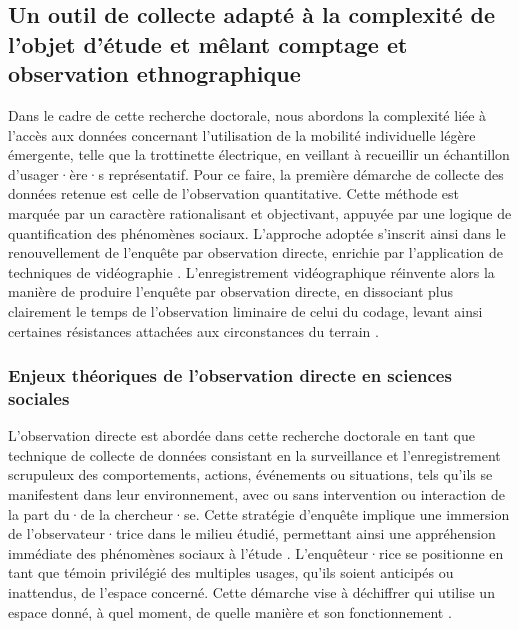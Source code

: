 \begin{refsegment}
\subsection{Un outil de collecte adapté à la complexité de l’objet d’étude et mêlant comptage et observation ethnographique
    \label{chap3:observation-quantitative-outil-adapte}
    }
    
Dans le cadre de cette recherche doctorale, nous abordons la complexité liée à l'accès aux données concernant l'utilisation de la mobilité individuelle légère émergente, telle que la trottinette électrique, en veillant à recueillir un échantillon d'usager·ère·s représentatif. Pour ce faire, la première démarche de collecte des données retenue est celle de l'observation quantitative. Cette méthode est marquée par un caractère rationalisant et objectivant, appuyée par une logique de quantification des phénomènes sociaux. L'approche adoptée s'inscrit ainsi dans le renouvellement de l'enquête par observation directe, enrichie par l'application de techniques de vidéographie \textcolor{blue}{\autocite[43]{filion_compter_2011}}. L’enregistrement vidéographique réinvente alors la manière de produire l'enquête par observation directe, en dissociant plus clairement le temps de l’observation liminaire de celui du codage, levant ainsi certaines résistances attachées aux circonstances du terrain \textcolor{blue}{\autocite[100]{cochoy_mort_2013}}.%

\subsubsection*{Enjeux théoriques de l'observation directe en sciences sociales
    \label{chap3:enjeux-observation}
    }

L'observation directe est abordée dans cette recherche doctorale en tant que technique de collecte de données consistant en la surveillance et l'enregistrement scrupuleux des comportements, actions, événements ou situations, tels qu'ils se manifestent dans leur environnement, avec ou sans intervention ou interaction de la part du·de la chercheur·se. Cette stratégie d'enquête implique une immersion de l'observateur·trice dans le milieu étudié, permettant ainsi une appréhension immédiate des phénomènes sociaux à l'étude \textcolor{blue}{\autocite[15]{revillard_observation_2018}}. L'enquêteur·rice se positionne en tant que témoin privilégié des multiples usages, qu'ils soient anticipés ou inattendus, de l'espace concerné. Cette démarche vise à déchiffrer qui utilise un espace donné, à quel moment, de quelle manière et son fonctionnement \textcolor{blue}{\autocite[15]{revillard_observation_2018}}.%
    

\end{refsegment}
